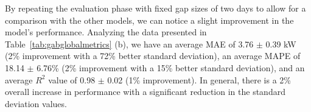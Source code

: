 \newpage
By repeating the evaluation phase with fixed gap sizes of two days to allow for a comparison with the other models, we can notice a slight improvement in the model's performance. Analyzing the data presented in Table~\ref{tab:gabglobalmetrics} (b), we have an average MAE of 3.76 $\pm$ 0.39 kW (2\% improvement with a 72\% better standard deviation), an average MAPE of 18.14 $\pm$ 6.76\% (2\% improvement with a 15\% better standard deviation), and an average $R^2$ value of 0.98 $\pm$ 0.02 (1\% improvement). In general, there is a 2\% overall increase in performance with a significant reduction in the standard deviation values.


